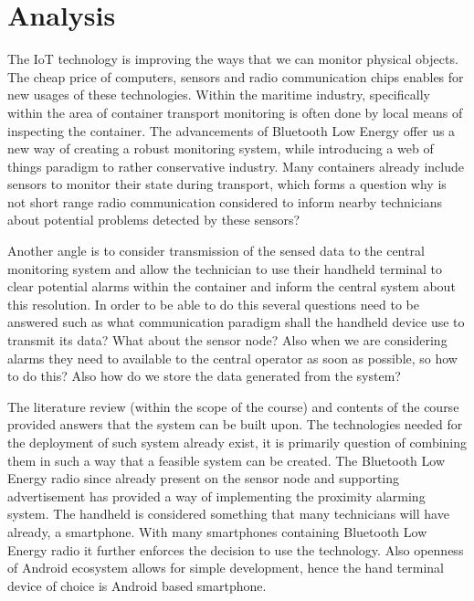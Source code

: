 \chapter{Analysis}
\label{cha:analysis}

The IoT technology is improving the ways that we can monitor physical objects. The cheap price of computers, sensors and radio communication chips enables for new usages of these technologies. Within the maritime industry, specifically within the area of container transport monitoring is often done by local means of inspecting the container. The advancements of Bluetooth Low Energy offer us a new way of creating a robust monitoring system, while introducing a web of things paradigm to rather conservative industry. Many containers already include sensors to monitor their state during transport, which forms a question why is not short range radio communication considered to inform nearby technicians about potential problems detected by these sensors? 

\bigskip

Another angle is to consider transmission of the sensed data to the central monitoring system and allow the technician to use their handheld terminal to clear potential alarms within the container and inform the central system about this resolution. In order to be able to do this several questions need to be answered such as what communication paradigm shall the handheld device use to transmit its data? What about the sensor node? Also when we are considering alarms they need to available to the central operator as soon as possible, so how to do this? Also how do we store the data generated from the system?

\bigskip

The literature review (within the scope of the course) and contents of the course provided answers that the system can be built upon. The technologies needed for the deployment of such system already exist, it is primarily question of combining them in such a way that a feasible system can be created. The Bluetooth Low Energy radio since already present on the sensor node and supporting advertisement has provided a way of implementing the proximity alarming system. The handheld is considered something that many technicians will have already, a smartphone. With many smartphones containing Bluetooth Low Energy radio it further enforces the decision to use the technology. Also openness of Android ecosystem allows for simple development, hence the hand terminal device of choice is Android based smartphone.

